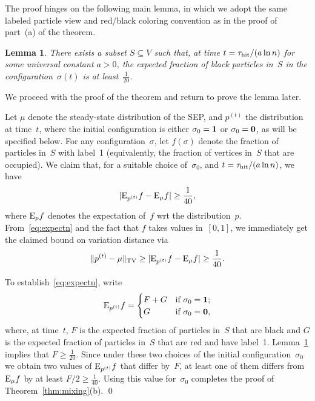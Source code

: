 \documentclass[11pt]{article}
\theoremstyle{plain}
\newtheorem{lemma}[theorem]{Lemma}
\theoremstyle{definition}
\theoremstyle{remark}
\numberwithin{equation}{section}
\newcommand{\hit}{\tau_{\rm hit}}
\newenvironment{proofof}[1]{{\par\bigskip\noindent \em Proof of #1.}\/}{\hfill\qed\bigskip}
\begin{document}
\begin{proofof}{Theorem~\ref{thm:mixing}(b)}
The proof hinges on the following main lemma, in which we adopt the same labeled particle
view and red/black coloring convention as in the proof of part~(a) of the theorem.
\begin{lemma}\label{lem:lowerbd}
There exists a subset $S\subseteq V$ such that, at time
$t=\hit/(a\ln n)$ for some universal constant $a>0$, the expected fraction of black particles in~$S$ in the
configuration~$\sigma(t)$ is at least~$\frac{1}{20}$.
\end{lemma}

We proceed with the proof of the theorem and return to prove the lemma later.

Let $\mu$ denote the steady-state distribution of the SEP, and $p^{(t)}$ the distribution at time~$t$,
where the initial configuration is either $\sigma_0 = {\bf 1}$ or $\sigma_0 = {\bf 0}$, as will be specified below.
For any configuration~$\sigma$, let $f(\sigma)$ denote the fraction of particles in~$S$ with label~1
(equivalently, the fraction of vertices in~$S$ that are occupied).
We claim that, for a suitable choice of~$\sigma_0$, and $t=\hit/(a\ln n)$, we have
\begin{equation}\label{eq:expectn}
         |{\rm E}_{p^{(t)}} f - {\rm E}_{\mu} f | \ge \frac{1}{40},
\end{equation}         
where ${\rm E}_p f$ denotes the expectation of~$f$ wrt the distribution~$p$.  From~\eqref{eq:expectn}
and the fact that $f$ takes values in~$[0,1]$,
we immediately get the claimed bound on variation distance via $$
   \Vert p^{(t)} - \mu \Vert_{\rm TV} \ge  |{\rm E}_{p^{(t)}} f - {\rm E}_{\mu} f | \ge \frac{1}{40}.  $$
   
To establish~\eqref{eq:expectn}, write 
\begin{equation}\label{eq:convex}
   {\rm E}_{p^{(t)}} f = \begin{cases} F + G & \hbox{\rm if {$\sigma_0={{\bf 1}}$};}\cr
                                                          G & \hbox{\rm if {$\sigma_0={{\bf 0}}$}},\cr
   \end{cases}
\end{equation}
where, at time~$t$, $F$ is the expected fraction of particles in~$S$ that are black and $G$ is the expected fraction
of particles in~$S$ that are red and have label~1.  Lemma~\ref{lem:lowerbd} implies that $F\ge\frac{1}{20}$.
Since under these two choices of the initial configuration~$\sigma_0$ we obtain two values of ${\rm E}_{p^{(t)}} f$ that 
differ by~$F$, at least one of them differs from ${\rm E}_{\mu} f$ by at least $F/2\ge\frac{1}{40}$.  
Using this value for~$\sigma_0$ completes the proof of Theorem~\ref{thm:mixing}(b).
\end{proofof}
\end{document}
